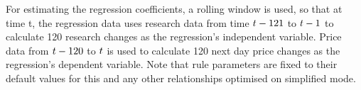 \documentclass{article}%
\begin{document}
\vspace{1mm}
\justify For estimating the regression coefficients, a rolling window is used, so that at time t, the
regression data uses research data from time $t - 121$ to $t - 1$ to calculate 120 research changes as the regression’s independent variable. Price data from $t - 120$ to $t$ is used to calculate 120 next day price changes as the regression’s dependent variable. 
\vspace{1mm}
\justify Note that rule parameters are fixed to their default values for this and any other relationships optimised on simplified mode.



\assumptions%
\keyterms%
\furtherlinks%

\appendixinfertrade{

\vspace{1mm}

\regressionanderrorpartone

}
\end{document}
